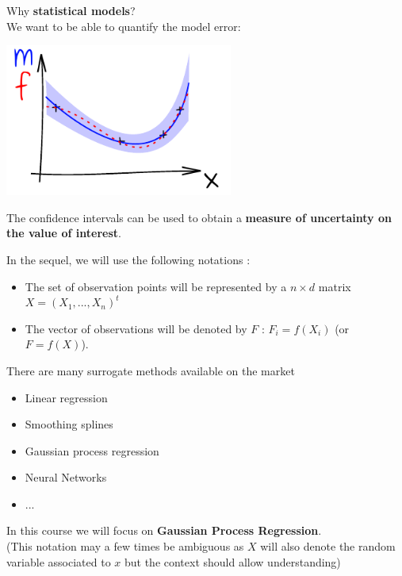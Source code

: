 \begin{frame}{}
Why \textbf{statistical models}? \\We want to be able to quantify the model error:
\begin{center}
\includegraphics[height=5cm]{1_stat_models/figures/ink_mconfint}
\end{center}
The confidence intervals can be used to obtain a \textbf{measure of uncertainty on the value of interest}.
\end{frame}

\begin{frame}{}
In the sequel, we will use the following notations :
\begin{itemize}
	\item The set of observation points will be represented by a $n \times d$ matrix $X=(X_1, ..., X_n)^t$
	\item The vector of observations will be denoted by $F$ : $F_i=f(X_i)$ (or $F=f(X)$).
\end{itemize}
There are many surrogate methods available on the market
\begin{itemize}
	\item Linear regression
	\item Smoothing splines
	\item Gaussian process regression
	\item Neural Networks
    \item ...
\end{itemize}
In this course we will focus on \textbf{Gaussian Process Regression}. \\
{\tiny (This notation may a few times be ambiguous as $X$ will also denote the random variable associated to $x$
but the context should allow understanding)}
\end{frame}


